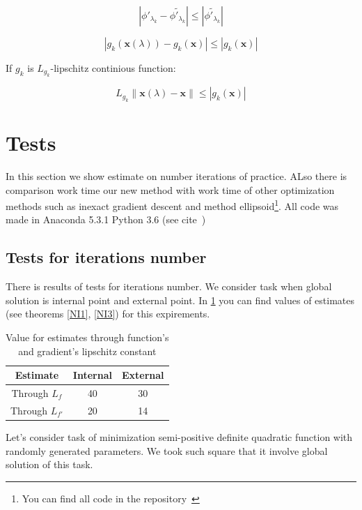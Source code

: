 \documentclass[12pt]{article}
\begin{document}
$$|\phi'_{\lambda_k} - \widetilde{\phi'_{\lambda_k}}|\leq |\widetilde{\phi'_{\lambda_k}}|$$

$$|g_k(\textbf{x}(\lambda))-g_k(\textbf{x})|\leq |g_k(\textbf{x})|$$

If $g_k$ is $L_{g_k}$-lipschitz continious function:

$$L_{g_k}\|\textbf{x}(\lambda)-\textbf{x}\|\leq |g_k(\textbf{x})|$$

\section{Tests}

In this section we show estimate on number iterations of practice. ALso there is comparison work time our new method with work time of other optimization methods such as inexact gradient descent and method ellipsoid\footnote{You can find all code in the repository~\cite{my_git}}. All code was made in Anaconda 5.3.1 Python 3.6 (see cite~\cite{conda})

\subsection{Tests for iterations number}

There is results of tests for iterations number. We consider task when global solution is internal point and external point. In \ref{table:est} you can find values of estimates (see theorems \ref{NI1}, \ref{NI3}) for this expirements.

\begin{table}[h!]
\centering
\begin{tabular}{||c|c|c||}
\hline
Estimate& Internal & External \\
\hline
Through $L_f$ & 40& 30\\
\hline
Through $L_{f'}$ & 20& 14\\
\hline
\end{tabular}
\caption{Value for estimates through function's and gradient's lipschitz constant}
\label{table:est}
\end{table}

Let's consider task of minimization semi-positive definite quadratic function with randomly generated parameters. We took such square that it involve global solution of this task.
\end{document}
